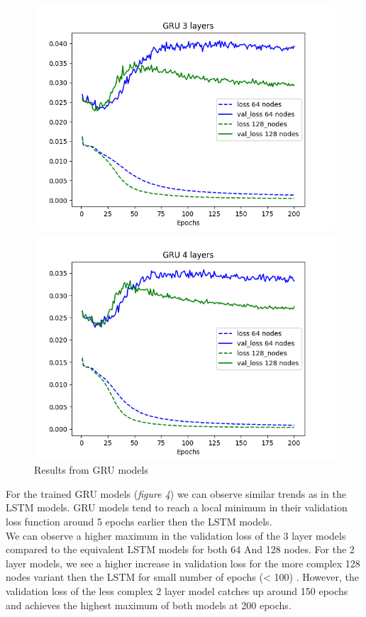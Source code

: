 \documentclass[11pt]
{article}
\begin{document}
\begin{figure}[H]
\begin{minipage}[b]{0.33\linewidth}
		\includegraphics[width=\linewidth]{../TESTS_RESULTS/GRU_tests/plots/3_comp.png} 
	\end{minipage}%
	\begin{minipage}[b]{0.33\linewidth}
		\centering
		\includegraphics[width=\linewidth]{../TESTS_RESULTS/GRU_tests/plots/4_comp.png} 
	\end{minipage} 
	\caption{Results from GRU models} 
	\label{fig:GRUplots}
\end{figure}

For the trained GRU models (\textit{figure 4}) we can observe similar trends as in the LSTM models. GRU models tend to reach a local minimum in their validation loss function around 5 epochs earlier then the LSTM models. 
\\
We can observe a higher maximum in the validation loss of the 3 layer models compared to the equivalent LSTM models for both 64 And 128 nodes. For the 2 layer models, we see a higher increase in validation loss for the more complex 128 nodes variant then the LSTM for small number of epochs (< 100) . However, the validation loss of the less complex 2 layer model catches up around 150 epochs and achieves the highest maximum of both models at 200 epochs.
\end{document}
